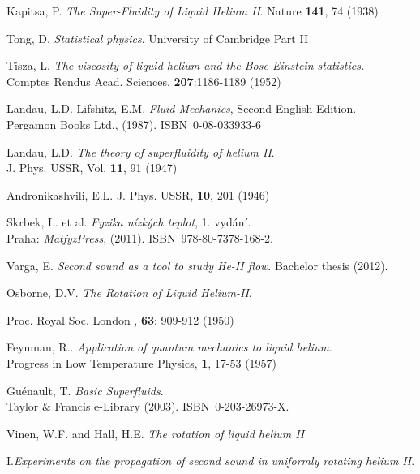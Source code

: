 
\def\bibname{Bibliography}
\begin{thebibliography}{99}
	\addcontentsline{toc}{chapter}{\bibname}
	
{\sc Kapitsa, P.}
\emph{The Super-Fluidity of Liquid Helium II}.
Nature \textbf{141}, 74 (1938)

{\sc Tong, D.}
\emph{Statistical physics}.
University of Cambridge Part II

{\sc Tisza, L.}
\emph{The viscosity of liquid helium and the Bose-Einstein statistics.}\\
Comptes Rendus Acad. Sciences, \textbf{207}:1186-1189 (1952)

{\sc Landau, L.D.}  {\sc Lifshitz, E.M.}
\emph{Fluid Mechanics}, Second English Edition.\\
Pergamon Books Ltd., (1987). \mbox{ISBN~0-08-033933-6}

{\sc Landau, L.D.}
\emph{The theory of superfluidity of helium II}.\\
J. Phys. USSR, Vol. \textbf{11}, 91 (1947)

{\sc Andronikashvili, E.L.}
J. Phys. USSR, \textbf{10}, 201 (1946)


{\sc Skrbek, L.} et al.
\emph{Fyzika nízkých teplot}, 1. vydání.\\
Praha: {\sl MatfyzPress}, (2011). \mbox{ISBN~978-80-7378-168-2}.

{\sc Varga, E.}
\emph{Second sound as a tool to study He-II flow}.
Bachelor thesis (2012).	

{\sc Osborne, D.V.}
\emph{The Rotation of Liquid Helium-II}.

Proc. Royal Soc. London , \textbf{63}: 909-912 (1950)

{\sc Feynman, R.}.
\emph{Application of quantum mechanics to liquid helium}.\\
Progress in Low Temperature Physics, \textbf{1}, 17-53 (1957)

{\sc Guénault, T.}
\emph{Basic Superfluids}.\\
Taylor $\&$ Francis e-Library (2003). ISBN~0-203-26973-X.

{\sc Vinen, W.F.} and {\sc Hall, H.E.}
\emph{The rotation of liquid helium II}

I.\hspace{2mm}\emph{Experiments on the propagation of second sound in uniformly rotating helium II}.


\end{thebibliography}
